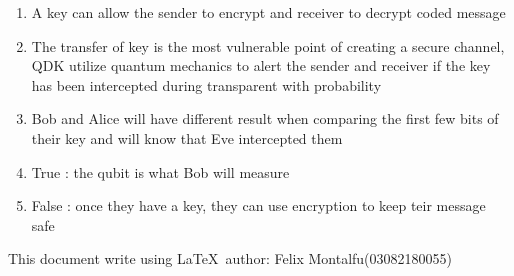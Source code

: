 \documentclass[a4paper]{article}
\begin{document}
    \begin{enumerate}[1.]
        \item A key can allow the sender to encrypt and receiver to decrypt coded message
        \item The transfer of key is the most vulnerable point of creating a secure channel, QDK utilize quantum mechanics to alert the sender and receiver if the key has been intercepted during transparent with probability
        \item Bob and Alice will have different result when comparing the first few bits of their key and will know that Eve intercepted them
        \item True : the qubit is what Bob will measure
        \item False : once they have a key, they can use encryption to keep teir message safe
    \end{enumerate}
    This document write using \LaTeX \ author: Felix Montalfu(03082180055)
\end{document}
